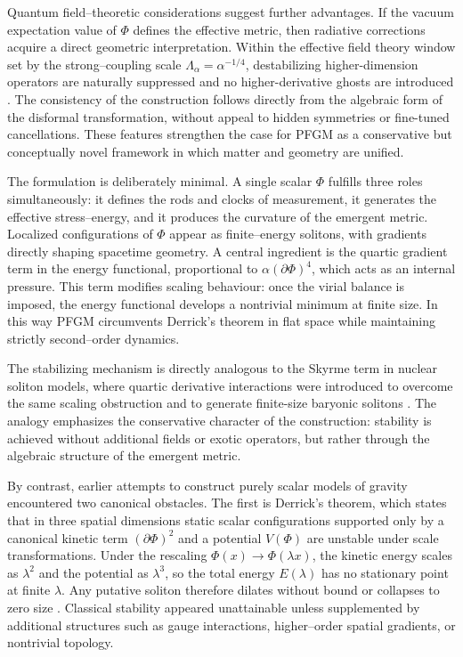 \documentclass{article}
\begin{document}
Quantum field–theoretic considerations suggest further advantages. If the vacuum expectation value of $\Phi$ defines the effective metric, then radiative corrections acquire a direct geometric interpretation. Within the effective field theory window set by the strong–coupling scale $\Lambda_\alpha=\alpha^{-1/4}$, destabilizing higher-dimension operators are naturally suppressed and no higher-derivative ghosts are introduced \cite{Burgess2007_EFT}. The consistency of the construction follows directly from the algebraic form of the disformal transformation, without appeal to hidden symmetries or fine-tuned cancellations. These features strengthen the case for PFGM as a conservative but conceptually novel framework in which matter and geometry are unified.

The formulation is deliberately minimal. A single scalar $\Phi$ fulfills three roles simultaneously: it defines the rods and clocks of measurement, it generates the effective stress–energy, and it produces the curvature of the emergent metric. Localized configurations of $\Phi$ appear as finite–energy solitons, with gradients directly shaping spacetime geometry. A central ingredient is the quartic gradient term in the energy functional, proportional to $\alpha (\partial \Phi)^4$, which acts as an internal pressure. This term modifies scaling behaviour: once the virial balance is imposed, the energy functional develops a nontrivial minimum at finite size. In this way PFGM circumvents Derrick’s theorem in flat space \cite{Derrick1964} while maintaining strictly second–order dynamics.

The stabilizing mechanism is directly analogous to the Skyrme term in nuclear soliton models, where quartic derivative interactions were introduced to overcome the same scaling obstruction and to generate finite-size baryonic solitons \cite{Skyrme1961,Adkins1983}. The analogy emphasizes the conservative character of the construction: stability is achieved without additional fields or exotic operators, but rather through the algebraic structure of the emergent metric.

By contrast, earlier attempts to construct purely scalar models of gravity encountered two canonical obstacles. The first is Derrick’s theorem, which states that in three spatial dimensions static scalar configurations supported only by a canonical kinetic term $(\partial \Phi)^2$ and a potential $V(\Phi)$ are unstable under scale transformations. Under the rescaling $\Phi(x)\to\Phi(\lambda x)$, the kinetic energy scales as $\lambda^2$ and the potential as $\lambda^3$, so the total energy $E(\lambda)$ has no stationary point at finite $\lambda$. Any putative soliton therefore dilates without bound or collapses to zero size \cite{Derrick1964}. Classical stability appeared unattainable unless supplemented by additional structures such as gauge interactions, higher–order spatial gradients, or nontrivial topology.  
\end{document}
